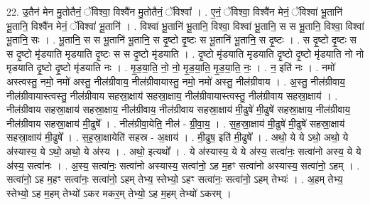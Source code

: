 \documentclass[17pt]{extarticle}
\begin{document}
22. उ॒तैन॑ मेन मु॒तोतैनं॒ ॅविश्वा॒ विश्वै॑न मु॒तोतैनं॒ ॅविश्वा᳚ । . ए॒नं॒ ॅविश्वा॒ विश्वै॑न मेनं॒ ॅविश्वा॑ भू॒तानि॑ भू॒तानि॒ विश्वै॑न मेनं॒ ॅविश्वा॑ भू॒तानि॑ । . विश्वा॑ भू॒तानि॑ भू॒तानि॒ विश्वा॒ विश्वा॑ भू॒तानि॒ स स भू॒तानि॒ विश्वा॒ विश्वा॑ भू॒तानि॒ सः । . भू॒तानि॒ स स भू॒तानि॑ भू॒तानि॒ स दृ॒ष्टो दृ॒ष्टः स भू॒तानि॑ भू॒तानि॒ स दृ॒ष्टः । . स दृ॒ष्टो दृ॒ष्टः स स दृ॒ष्टो मृ॑डयाति मृडयाति दृ॒ष्टः स स दृ॒ष्टो मृ॑डयाति । . दृ॒ष्टो मृ॑डयाति मृडयाति दृ॒ष्टो दृ॒ष्टो मृ॑डयाति नो नो मृडयाति दृ॒ष्टो दृ॒ष्टो मृ॑डयाति नः । . मृ॒ड॒या॒ति॒ नो॒ नो॒ मृ॒ड॒या॒ति॒ मृ॒ड॒या॒ति॒ नः॒ । . न॒ इति॑ नः । . नमो॑ अस्त्वस्तु॒ नमो॒ नमो॑ अस्तु॒ नील॑ग्रीवाय॒ नील॑ग्रीवायास्तु॒ नमो॒ नमो॑ अस्तु॒ नील॑ग्रीवाय । . अ॒स्तु॒ नील॑ग्रीवाय॒ नील॑ग्रीवायास्त्वस्तु॒ नील॑ग्रीवाय सहस्रा॒क्षाय॑ सहस्रा॒क्षाय॒ नील॑ग्रीवायास्त्वस्तु॒ नील॑ग्रीवाय सहस्रा॒क्षाय॑ । . नील॑ग्रीवाय सहस्रा॒क्षाय॑ सहस्रा॒क्षाय॒ नील॑ग्रीवाय॒ नील॑ग्रीवाय सहस्रा॒क्षाय॑ मी॒ढुषे॑ मी॒ढुषे॑ सहस्रा॒क्षाय॒ नील॑ग्रीवाय॒ नील॑ग्रीवाय सहस्रा॒क्षाय॑ मी॒ढुषे᳚ । . नील॑ग्रीवा॒येति॒ नील॑ - ग्री॒वा॒य॒ । . स॒ह॒स्रा॒क्षाय॑ मी॒ढुषे॑ मी॒ढुषे॑ सहस्रा॒क्षाय॑ सहस्रा॒क्षाय॑ मी॒ढुषे᳚ । . स॒ह॒स्रा॒क्षायेति॑ सहस्र - अ॒क्षाय॑ । . मी॒ढुष॒ इति॑ मी॒ढुषे᳚ । . अथो॒ ये ये ऽथो॒ अथो॒ ये अ॑स्यास्य॒ ये ऽथो॒ अथो॒ ये अ॑स्य । . अथो॒ इत्यथो᳚ । . ये अ॑स्यास्य॒ ये ये अ॑स्य॒ सत्वा॑नः॒ सत्वा॑नो अस्य॒ ये ये अ॑स्य॒ सत्वा॑नः । . अ॒स्य॒ सत्वा॑नः॒ सत्वा॑नो अस्यास्य॒ सत्वा॑नो॒ ऽह म॒हꣳ सत्वा॑नो अस्यास्य॒ सत्वा॑नो॒ ऽहम् । . सत्वा॑नो॒ ऽह म॒हꣳ सत्वा॑नः॒ सत्वा॑नो॒ ऽहम् तेभ्य॒ स्तेभ्यो॒ ऽहꣳ सत्वा॑नः॒ सत्वा॑नो॒ ऽहम् तेभ्यः॑ । . अ॒हम् तेभ्य॒ स्तेभ्यो॒ ऽह म॒हम् तेभ्यो॑ ऽकर मकर॒म् तेभ्यो॒ ऽह म॒हम् तेभ्यो॑ ऽकरम् । \newline
\end{document}
